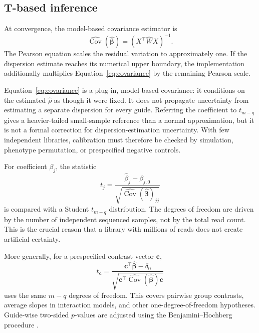\subsection{T-based inference}

At convergence, the model-based covariance estimator is
\begin{equation}
  \widehat{\operatorname{Cov}}
  (\widehat{\boldsymbol{\beta}})
  =(X^\top\widehat{W}X)^{-1}.
  \label{eq:covariance}
\end{equation}
The Pearson equation scales the residual variation to approximately one.  If
the dispersion estimate reaches its numerical upper boundary, the
implementation additionally multiplies Equation~\eqref{eq:covariance} by the
remaining Pearson scale.

Equation~\eqref{eq:covariance} is a plug-in, model-based covariance: it
conditions on the estimated $\widehat{\rho}$ as though it were fixed.  It does
not propagate uncertainty from estimating a separate dispersion for every
guide.  Referring the coefficient to $t_{m-q}$ gives a heavier-tailed
small-sample reference than a normal approximation, but it is not a formal
correction for dispersion-estimation uncertainty.  With few independent
libraries, calibration must therefore be checked by simulation, phenotype
permutation, or prespecified negative controls.

For coefficient $\beta_j$, the statistic
\begin{equation}
  t_j =
  \frac{\widehat{\beta}_j-\beta_{j,0}}
  {\sqrt{
  \widehat{\operatorname{Cov}}
  (\widehat{\boldsymbol{\beta}})_{jj}}}
  \label{eq:tstat}
\end{equation}
is compared with a Student $t_{m-q}$ distribution.  The degrees of freedom are
driven by the number of independent sequenced samples, not by the total read
count.  This is the crucial reason that a library with millions of reads does
not create artificial certainty.

More generally, for a prespecified contrast vector $\mathbf{c}$,
\begin{equation}
  t_{\mathbf{c}} =
  \frac{\mathbf{c}^\top\widehat{\boldsymbol{\beta}}-\delta_0}
  {\sqrt{\mathbf{c}^\top
  \widehat{\operatorname{Cov}}(\widehat{\boldsymbol{\beta}})
  \mathbf{c}}}
\end{equation}
uses the same $m-q$ degrees of freedom.  This covers pairwise group contrasts,
average slopes in interaction models, and other one-degree-of-freedom
hypotheses.  Guide-wise two-sided $p$-values are adjusted using the
Benjamini--Hochberg procedure \citep{benjamini1995controlling}.

